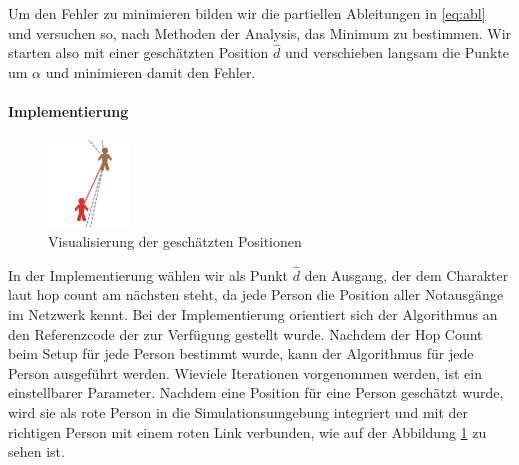 Um den Fehler zu minimieren bilden wir die partiellen Ableitungen in \ref{eq:abl} und versuchen so, nach Methoden der Analysis, das Minimum zu bestimmen. Wir starten also mit einer geschätzten Position \( \hat d \) und verschieben langsam die Punkte um \( \alpha \) und minimieren damit den Fehler.

\paragraph{Implementierung} 

\begin{figure}[h!]
\centering
\includegraphics{algorithmik/visu}
\caption{Visualisierung der geschätzten Positionen}
 \label{visu}
\end{figure}

In der Implementierung wählen wir als Punkt \( \hat d \) den Ausgang, der dem Charakter laut hop count am nächsten steht, da jede Person die Position aller Notausgänge im Netzwerk kennt. Bei der Implementierung orientiert sich der Algorithmus an den Referenzcode der zur Verfügung gestellt wurde. Nachdem der Hop Count beim Setup für jede Person bestimmt wurde, kann der Algorithmus für jede Person ausgeführt werden. Wieviele Iterationen vorgenommen werden, ist ein einstellbarer Parameter. Nachdem eine Position für eine Person geschätzt wurde, wird sie als rote Person in die Simulationsumgebung integriert und mit der richtigen Person mit einem roten Link verbunden, wie auf der Abbildung \ref{visu} zu sehen ist.




